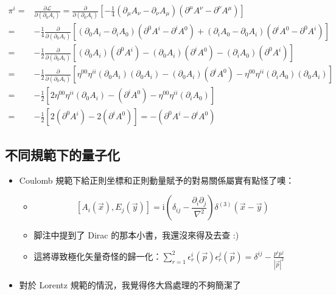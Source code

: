 \documentclass{article}
\begin{document}
$$
\begin{aligned}
\pi^i= & \frac{\partial\mathcal{L}}{\partial(\partial_0A_i)}=\frac{\partial}{\partial(\partial_0A_i)}\left[-\frac{1}{4}(\partial_{\mu}A_{\nu}-\partial_{\nu}A_{\mu})(\partial^{\mu}A^{\nu}-\partial^{\nu}A^{\mu})\right] \\
=      & -\frac{1}{4}\frac{\partial}{\partial(\partial_0A_i)}\left[(\partial_0A_i-\partial_iA_0)(\partial^0A^i-\partial^iA^0)+(\partial_iA_0-\partial_0A_i)(\partial^iA^0-\partial^0A^i)\right]                          \\
=      & -\frac{1}{2}\frac{\partial}{\partial(\partial_0A_i)}\left[(\partial_0A_i)(\partial^0A^i)-(\partial_0A_i)(\partial^iA^0)-(\partial_iA_0)(\partial^0A^i)\right]                                                   \\
=      & -\frac{1}{2}\frac{\partial}{\partial(\partial_0A_i)}\left[\eta^{00}\eta^{ii}(\partial_0A_i)(\partial_0A_i)-(\partial_0A_i)(\partial^iA^0)-\eta^{00}\eta^{ii}(\partial_iA_0)(\partial_0A_i)\right]               \\
=      & -\frac{1}{2}\left[2\eta^{00}\eta^{ii}(\partial_0A_i)-(\partial^iA^0)-\eta^{00}\eta^{ii}(\partial_iA_0)\right]                                                                                                   \\
=      & -\frac{1}{2}\left[2(\partial^0A^i)-2(\partial^iA^0)\right]=-(\partial^0A^i-\partial^iA^0)
\end{aligned}
$$

\subsection{不同規範下的量子化}

\begin{itemize}
\item Coulomb 規範下給正則坐標和正則動量賦予的對易關係屬實有點怪了噢：
\begin{itemize}
  \item $$
    [A_i(\vec{x}),E_j(\vec{y})]=\mathrm{i}(\delta_{ij}-\frac{\partial_i\partial_j}{\nabla^2})\delta^{(3)}(\vec{x}-\vec{y})
    $$
\item 脚注中提到了 Dirac 的那本小書，我還沒來得及去查 :)
\item 這將導致極化矢量奇怪的歸一化：$\sum_{r=1}^2\epsilon_r^i(\vec{p})\epsilon_r^j(\vec{p})=\delta^{ij}-\frac{p^ip^j}{|\vec{p}|^2}$
\end{itemize}
\item 對於 Lorentz 規範的情況，我覺得佟大爲處理的不夠簡潔了~
\end{itemize}
\end{document}
